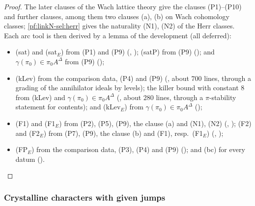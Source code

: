 \begin{proof}
The later clauses of the Wach lattice theory  give the clauses (P1)--(P10) and
further clauses, among them two clauses (a), (b) on Wach cohomology classes; \cref{pf:linkN-sel:herr} gives the naturality (N1), (N2) of the
Herr classes. Each arc tool is then derived by a lemma of the development (all deferred):
\begin{itemize}
\item (sat) and (sat$_E$) from (P1) and (P9) (,
); (satP) from (P9)
(); and $\gamma(\pi_0)\in\pi_0A^\Delta$ from (P9)
();
\item (kLev) from the comparison data, (P4) and (P9) (,
about $700$ lines, through a grading of the annihilator ideals by levels); the killer bound with constant $8$ from (kLev) and
$\gamma(\pi_0)\in\pi_0A^\Delta$ (, about $280$ lines, through a
$\pi$-stability statement for contents); and (kLev$_E$) from $\gamma(\pi_0)\in\pi_0A^\Delta$
();
\item (F1) and (F1$_E$) from (P2), (P5), (P9), the clause (a) and (N1), (N2)
(,
); (F2) and (F2$_E$) from (P7), (P9), the clause (b) and
(F1), resp.\ (F1$_E$) (,
);
\item (FP$_E$) from the comparison data, (P3), (P4) and (P9) ();
and (bc) for every datum ().\qedhere
\end{itemize}
\end{proof}

\subsubsection{Crystalline characters with given jumps}

